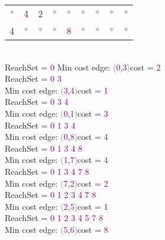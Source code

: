 \begin{tcolorbox}
{\begin{tabular}{*{9}{c}}
        \textcolor{Gray}{*} & \textcolor{Purple}{4} & \textcolor{Purple}{2} & \textcolor{Gray}{*} & \textcolor{Gray}{*} & \textcolor{Gray}{*} & \textcolor{Gray}{*} & \textcolor{Gray}{*} & \textcolor{Gray}{*} \\
        
        \textcolor{Purple}{4} & \textcolor{Gray}{*} & \textcolor{Gray}{*} & \textcolor{Gray}{*} & \textcolor{Purple}{8} & \textcolor{Gray}{*} & \textcolor{Gray}{*} & \textcolor{Gray}{*} & \textcolor{Gray}{*} \\
        
    \end{tabular}
    \\
    ReachSet = \textcolor{Purple}{0} Min cost edge: \textcolor{Gray}{(}\textcolor{Purple}{0},\textcolor{Purple}{3}\textcolor{Gray}{)}cost = \textcolor{Purple}{2} \\
    ReachSet = \textcolor{Purple}{0 3} \\
    Min cost edge: \textcolor{Gray}{(}\textcolor{Purple}{3},\textcolor{Purple}{4}\textcolor{Gray}{)}cost = \textcolor{Purple}{1} \\
    ReachSet = \textcolor{Purple}{0 3 4} \\
    Min cost edge: \textcolor{Gray}{(}\textcolor{Purple}{0},\textcolor{Purple}{1}\textcolor{Gray}{)}cost = \textcolor{Purple}{3} \\
    ReachSet = \textcolor{Purple}{0 1 3 4} \\
    Min cost edge: \textcolor{Gray}{(}\textcolor{Purple}{0},\textcolor{Purple}{8}\textcolor{Gray}{)}cost = \textcolor{Purple}{4} \\
    ReachSet = \textcolor{Purple}{0 1 3 4 8} \\
    Min cost edge: \textcolor{Gray}{(}\textcolor{Purple}{1},\textcolor{Purple}{7}\textcolor{Gray}{)}cost = \textcolor{Purple}{4} \\
    ReachSet = \textcolor{Purple}{0 1 3 4 7 8} \\
    Min cost edge: \textcolor{Gray}{(}\textcolor{Purple}{7},\textcolor{Purple}{2}\textcolor{Gray}{)}cost = \textcolor{Purple}{2} \\
    ReachSet = \textcolor{Purple}{0 1 2 3 4 7 8} \\
    Min cost edge: \textcolor{Gray}{(}\textcolor{Purple}{2},\textcolor{Purple}{5}\textcolor{Gray}{)}cost = \textcolor{Purple}{1} \\
    ReachSet = \textcolor{Purple}{0 1 2 3 4 5 7 8} \\
    Min cost edge: \textcolor{Gray}{(}\textcolor{Purple}{5},\textcolor{Purple}{6}\textcolor{Gray}{)}cost = \textcolor{Purple}{8} \\
}
\end{tcolorbox}
